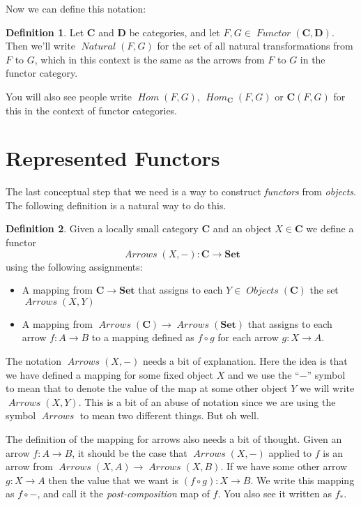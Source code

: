 \documentclass[12pt]{article}
\theoremstyle{definition}
\theoremstyle{definition}
\newtheorem{defn}{Definition}[]
\theoremstyle{definition}
\numberwithin{equation}{section}
\newcommand{\cat}[1]{\mathbf{#1}}      %
\newcommand{\fcat}[1]{{\mathbf {#1}}}    %
\newcommand{\CC}{\cat{C}}
\newcommand{\DD}{\cat{D}}
\DeclareMathOperator{\Arrows}{\mathit{Arrows}}
\DeclareMathOperator{\Objects}{\mathit{Objects}}
\DeclareMathOperator{\Hom}{\mathit{Hom}}
\DeclareMathOperator{\Nat}{\mathit{Natural}}
\DeclareMathOperator{\Fun}{\mathit{Functor}}
\newcommand{\Set}{\fcat{Set}}           %
\def\ni{\goodbreak\noindent}
\begin{document}
Now we can define this notation:

\begin{defn}
Let $\CC$ and $\DD$ be categories, and let $F, G \in \Fun(\CC, \DD)$. Then
we'll write $\Nat(F, G)$ for the set of all natural transformations from $F$ to $G$, which
in this context is the same as the arrows from $F$ to $G$ in the functor category.
\end{defn}
\ni
You will also see people write $\Hom(F, G)$, $\Hom_{\CC}(F,G)$ or $\CC(F, G)$ for this in the context
of functor categories.

\section{Represented Functors}

The last conceptual step that we need is a way to construct {\it functors} from {\it
objects}. The following definition is a natural way to do this.

\begin{defn}
Given a locally small category $\CC$ and an object $X \in \CC$ we define a functor
$$
\Arrows(X,-) : \CC \to \Set
$$
using the following assignments:
\begin{itemize}
\item A mapping from $\CC \to \Set$ that assigns to each $Y \in \Objects(\CC)$ the set
$\Arrows(X,Y)$
\item A mapping from $\Arrows(\CC) \to \Arrows(\Set) $ that assigns to each arrow $f: A
\to B$ to a mapping defined as $f\circ g$ for each arrow $g: X \to A$.
\end{itemize}
\end{defn}

The notation $\Arrows(X,-)$ needs a bit of explanation. Here the idea is that we have defined
a mapping for some fixed object $X$ and we use the ``$-$'' symbol to mean that to
denote the value of the map at some other object $Y$ we will write 
$\Arrows(X,Y)$. This is a bit of an abuse of notation since we 
are using the symbol $\Arrows$ to mean two different things. But oh well.

The definition of the mapping for arrows also needs a bit of thought.
Given an arrow $f: A \to B$, it should be the case that $\Arrows(X,-)$ applied to
$f$ is an arrow from $\Arrows(X,A) \to \Arrows(X,B)$.  If we have some other arrow
$g: X \to A$ then the value that we want is $(f \circ g): X \to B$.
We write this mapping as $f \circ -$, and call it the {\it post-composition} map of $f$.
You also see it written as $f_*$.
\end{document}
